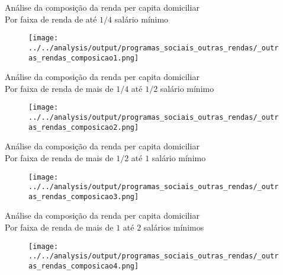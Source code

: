 \begin{frame}[label=_outras_rendas_composicao]{{\small Análise da composição da renda per capita domiciliar \\  Por faixa de renda de até $1/4$ salário mínimo}}
\textit{\hyperlink{_novos_resultados}{}}
\begin{figure}
  \centering
  \texttt{[image: ../../analysis/output/programas\_sociais\_outras\_rendas/\_outras\_rendas\_composicao1.png]}
  \caption{}
  \label{fig:_outras_rendas_composicao1}
\end{figure}
\end{frame}


\begin{frame}[label=_outras_rendas_composicao]{{\small Análise da composição da renda per capita domiciliar \\  Por faixa de renda de mais de $1/4$ até $1/2$ salário mínimo}}
\textit{\hyperlink{_novos_resultados}{}}
\begin{figure}
  \centering
  \texttt{[image: ../../analysis/output/programas\_sociais\_outras\_rendas/\_outras\_rendas\_composicao2.png]}
  \caption{}
  \label{fig:_outras_rendas_composicao2}
\end{figure}
\end{frame}


\begin{frame}[label=_outras_rendas_composicao]{{\small Análise da composição da renda per capita domiciliar \\  Por faixa de renda de mais de $1/2$ até $1$ salário mínimo}}
\textit{\hyperlink{_novos_resultados}{}}
\begin{figure}
  \centering
  \texttt{[image: ../../analysis/output/programas\_sociais\_outras\_rendas/\_outras\_rendas\_composicao3.png]}
  \caption{}
  \label{fig:_outras_rendas_composicao3}
\end{figure}
\end{frame}



\begin{frame}[label=_outras_rendas_composicao]{{\small Análise da composição da renda per capita domiciliar \\  Por faixa de renda de mais de $1$ até $2$ salários mínimos}}
\textit{\hyperlink{_novos_resultados}{}}
\begin{figure}
  \centering
  \texttt{[image: ../../analysis/output/programas\_sociais\_outras\_rendas/\_outras\_rendas\_composicao4.png]}
  \caption{}
  \label{fig:_outras_rendas_composicao4}
\end{figure}
\end{frame}


